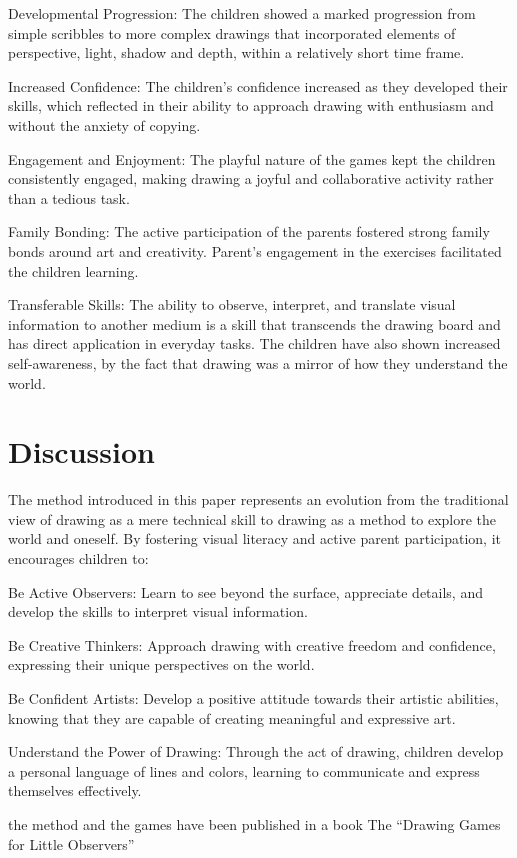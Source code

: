 \documentclass{article}
\begin{document}
Developmental Progression: The children showed a marked progression from simple scribbles to more complex drawings that incorporated elements of perspective, light, shadow and depth, within a relatively short time frame.

Increased Confidence: The children’s confidence increased as they developed their skills, which reflected in their ability to approach drawing with enthusiasm and without the anxiety of copying.

Engagement and Enjoyment: The playful nature of the games kept the children consistently engaged, making drawing a joyful and collaborative activity rather than a tedious task.

Family Bonding: The active participation of the parents fostered strong family bonds around art and creativity. Parent’s engagement in the exercises facilitated the children learning.

Transferable Skills: The ability to observe, interpret, and translate visual information to another medium is a skill that transcends the drawing board and has direct application in everyday tasks. The children have also shown increased self-awareness, by the fact that drawing was a mirror of how they understand the world.

\section{Discussion}

The method introduced in this paper represents an evolution from the traditional view of drawing as a mere technical skill to drawing as a method to explore the world and oneself. By fostering visual literacy and active parent participation, it encourages children to:

Be Active Observers: Learn to see beyond the surface, appreciate details, and develop the skills to interpret visual information.

Be Creative Thinkers: Approach drawing with creative freedom and confidence, expressing their unique perspectives on the world.

Be Confident Artists: Develop a positive attitude towards their artistic abilities, knowing that they are capable of creating meaningful and expressive art.

Understand the Power of Drawing: Through the act of drawing, children develop a personal language of lines and colors, learning to communicate and express themselves effectively.

the method and the games have been published in a book The “Drawing Games for Little Observers”  \cite{salimbeni2024drawing}
\end{document}
